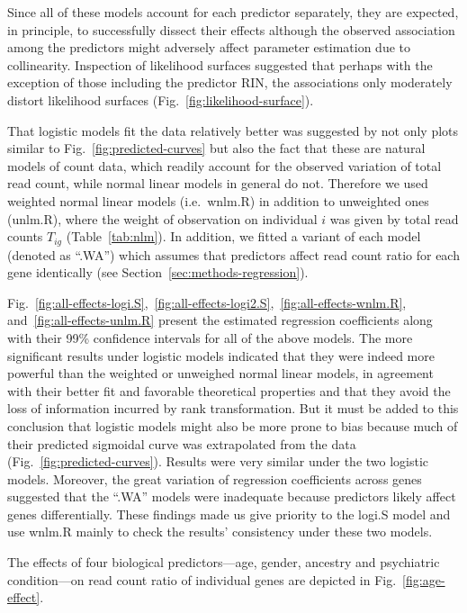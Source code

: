 \documentclass[letterpaper]{article}
\begin{document}
Since all of these models account for each predictor separately, they are
expected, in principle, to successfully dissect their effects although the
observed association among the predictors might adversely affect parameter
estimation due to collinearity.  Inspection of likelihood surfaces suggested
that perhaps with the exception of those including the predictor RIN, the
associations only moderately distort likelihood surfaces
(Fig.~\ref{fig:likelihood-surface}).

That logistic models fit the data relatively better was suggested by not only plots
similar to Fig.~\ref{fig:predicted-curves} but also the fact that these are natural
models of count data, which readily account for the observed variation of
total read count, while normal linear models in general do not.  Therefore we
used weighted normal linear models (i.e.~wnlm.R) in addition to unweighted
ones (unlm.R), where the weight of observation on individual \(i\) was given
by total read counts \(T_{ig}\) (Table~\ref{tab:nlm}).  In addition, we fitted
a variant of each model (denoted as ``.WA'') which assumes that predictors
affect read count ratio for each gene identically (see
Section~\ref{sec:methods-regression}).

Fig.~\ref{fig:all-effects-logi.S},~\ref{fig:all-effects-logi2.S},~\ref{fig:all-effects-wnlm.R},
and~\ref{fig:all-effects-unlm.R} present the estimated regression coefficients
along with their 99\% confidence intervals for all of the above models.  The
more significant results under logistic models indicated that they were indeed
more powerful than the weighted or unweighed normal linear models, in
agreement with their better fit and favorable theoretical properties and that
they avoid the loss of information incurred by rank transformation.  But it
must be added to this conclusion that logistic models might also be more prone
to bias because much of their predicted sigmoidal curve was extrapolated from
the data (Fig.~\ref{fig:predicted-curves}).  Results were very similar under
the two logistic models.  Moreover, the great variation of regression
coefficients across genes suggested that the ``.WA'' models were inadequate
because predictors likely affect genes differentially.  These findings made us
give priority to the logi.S model and use wnlm.R mainly to check the results'
consistency under these two models.

The effects of four biological predictors---age, gender, ancestry and
psychiatric condition---on read count ratio of individual genes are depicted
in Fig.~\ref{fig:age-effect}.
\end{document}
